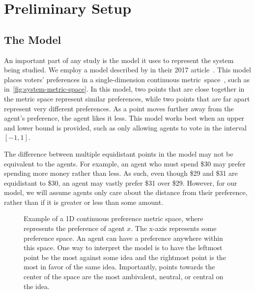 \section{Preliminary Setup}\label{sec:preliminary-setup}

\subsection{The Model}\label{subsec:the-model}
An important part of any study is the model it uses to represent the system being
studied.
We employ a model described by  in their 2017
article~\cite{Cohensius2017}.
This model places voters' preferences in a single-dimension continuous
metric~space~\systemspace, such as in~\autoref{fig:system-metric-space}.
In this model, two points that are close together in the metric space represent
similar preferences, while two points that are far apart represent very different
preferences.
As a point moves further away from the agent's preference, the agent likes it less.
This model works best when an upper and lower bound is provided, such as only
allowing agents to vote in the interval $[-1, 1]$.

The difference between multiple equidistant points in the model may not be equivalent
to the agents.
For example, an agent who must spend \$30 may prefer spending more money rather than
less.
As such, even though \$29 and \$31 are equidistant to \$30, an agent may vastly
prefer \$31 over \$29.
However, for our model, we will assume agents only care about the distance from their
preference, rather than if it is greater or less than some amount.

\begin{figure}[htbp]
    \centering
    
    \caption{
        Example of a 1D continuous preference metric space, where  represents
        the preference of agent $x$.
        The x-axis represents some preference space.
        An agent can have a preference anywhere within this space.
        One way to interpret the model is to have the leftmost point be the most
        against some idea and the rightmost point is the most in favor of the same idea.
        Importantly, points towards the center of the space are the most ambivalent,
        neutral, or central on the idea.
    }
    \label{fig:system-metric-space}
\end{figure}

